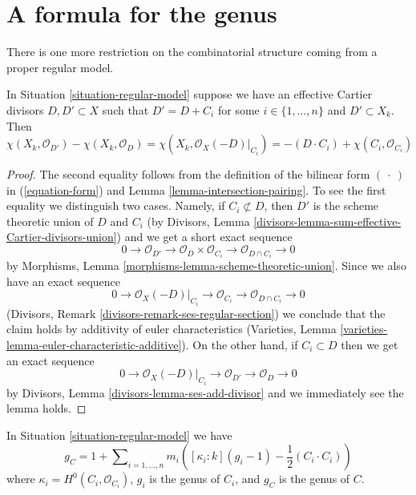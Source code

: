 \section{A formula for the genus}
\label{section-genus-formula}

\noindent
There is one more restriction on the combinatorial structure
coming from a proper regular model.

\begin{lemma}
\label{lemma-add-component}
In Situation \ref{situation-regular-model} suppose we have an
effective Cartier divisors $D, D' \subset X$ such that
$D' = D + C_i$ for some $i \in \{1, \ldots, n\}$ and $D' \subset X_k$.
Then
$$
\chi(X_k, \mathcal{O}_{D'}) - \chi(X_k, \mathcal{O}_D) =
\chi(X_k, \mathcal{O}_X(-D)|_{C_i}) =
-(D \cdot C_i) + \chi(C_i, \mathcal{O}_{C_i})
$$
\end{lemma}

\begin{proof}
The second equality follows from the definition of the bilinear form
$(\ \cdot\ )$ in (\ref{equation-form}) and
Lemma \ref{lemma-intersection-pairing}. To see the first
equality we distinguish two cases.
Namely, if $C_i \not \subset D$, then $D'$ is the scheme
theoretic union of $D$ and $C_i$ (by
Divisors, Lemma \ref{divisors-lemma-sum-effective-Cartier-divisors-union})
and we get a short exact sequence
$$
0 \to \mathcal{O}_{D'} \to
\mathcal{O}_D \times \mathcal{O}_{C_i} \to
\mathcal{O}_{D \cap C_i} \to 0
$$
by Morphisms, Lemma \ref{morphisms-lemma-scheme-theoretic-union}.
Since we also have an exact sequence
$$
0 \to \mathcal{O}_X(-D)|_{C_i} \to
\mathcal{O}_{C_i} \to \mathcal{O}_{D \cap C_i} \to 0
$$
(Divisors, Remark \ref{divisors-remark-ses-regular-section})
we conclude that the claim holds
by additivity of euler characteristics
(Varieties, Lemma \ref{varieties-lemma-euler-characteristic-additive}).
On the other hand, if $C_i \subset D$ then we get an
exact sequence
$$
0 \to \mathcal{O}_X(-D)|_{C_i} \to \mathcal{O}_{D'} \to \mathcal{O}_D \to 0
$$
by Divisors, Lemma \ref{divisors-lemma-ses-add-divisor}
and we immediately see the lemma holds.
\end{proof}

\begin{lemma}
\label{lemma-genus-formula}
In Situation \ref{situation-regular-model} we have
$$
g_C = 1 + \sum\nolimits_{i = 1, \ldots, n}
m_i\left([\kappa_i : k] (g_i - 1) - \frac{1}{2}(C_i \cdot C_i)\right)
$$
where $\kappa_i = H^0(C_i, \mathcal{O}_{C_i})$,
$g_i$ is the genus of $C_i$, and $g_C$ is the genus of $C$.
\end{lemma}

